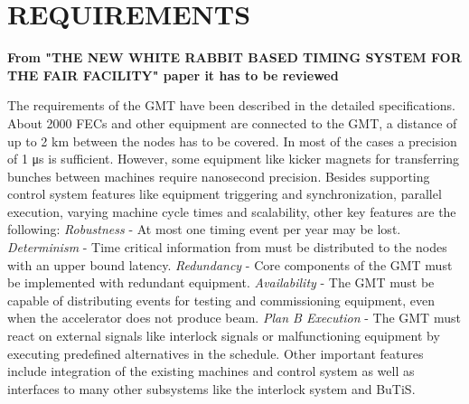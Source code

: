 \section{REQUIREMENTS}


\textbf{From "THE NEW WHITE RABBIT BASED TIMING SYSTEM FOR THE FAIR
FACILITY" paper it has to be reviewed}

The requirements of the GMT have been described in the detailed specifications.
About 2000 FECs and other equipment are connected to the GMT, a distance of up to
2 km between the nodes has to be covered. In most of the cases a precision of 1
μs is sufficient. However, some equipment like kicker magnets for transferring bunches 
between machines require nanosecond precision.
Besides supporting control system features like equipment triggering and synchronization, 
parallel execution, varying machine cycle times and scalability, other key features are 
the following: \textit{Robustness} - At most one timing event per year may be
lost. \textit{Determinism} - Time critical information from must be distributed to the nodes with 
an upper bound latency. \textit{Redundancy} - Core components
of the GMT must be implemented with redundant equipment. \textit{Availability} - The GMT must be capable of 
distributing events for testing and commissioning equipment, even when the accelerator does not produce 
beam. \textit{Plan B Execution} - The GMT must react on external signals like interlock signals or malfunctioning 
equipment by executing predefined alternatives in the schedule. Other important features include 
integration of the existing machines and control system as well as interfaces to
many other subsystems like the interlock system and BuTiS.

